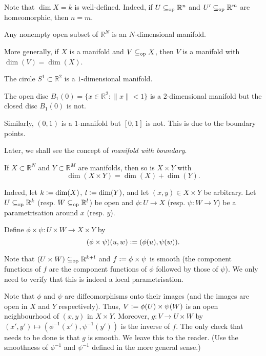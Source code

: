 Note that $\dim X = k$ is well-defined. Indeed, if $U \subseteq_{\operatorname{op}} \mathbb{R}^{n}$ and $U' \subseteq_{\operatorname{op}} \mathbb{R}^{m}$ are homeomorphic, then $n = m$.

\begin{ex}
	Any nonempty open subset of $\mathbb{R}^{N}$ is an $N$-dimensional manifold.

	More generally, if $X$ is a manifold and $V \subseteq_{\operatorname{op}} X$, then $V$ is a manifold with $\dim(V) = \dim(X)$.
\end{ex}

\begin{ex}
	The circle $S^{1} \subset \mathbb{R}^{2}$ is a $1$-dimensional manifold.

	The open disc $B_{1}(0) = \{x \in \mathbb{R}^{2} : \|x\| < 1\}$ is a $2$-dimensional manifold but the closed disc $\overline{B_{1}(0)}$ is not. 

	Similarly, $(0, 1)$ is a $1$-manifold but $[0, 1]$ is not. This is due to the boundary points.

	Later, we shall see the concept of \emph{manifold with boundary}.
\end{ex}

\begin{ex}
	If $X \subset \mathbb{R}^{N}$ and $Y \subset \mathbb{R}^{M}$ are manifolds, then so is $X \times Y$ with
	\begin{equation*} 
		\boxed{\dim(X \times Y) = \dim(X) + \dim(Y).}
	\end{equation*}

	Indeed, let $k \vcentcolon= \dim(X)$, $l \vcentcolon= \dim(Y)$, and let $(x, y) \in X \times Y$ be arbitrary. Let $U \subseteq_{\operatorname{op}} \mathbb{R}^{k}$ (resp. $W \subseteq_{\operatorname{op}} \mathbb{R}^{l}$) be open and $\phi : U \to X$ (resp. $\psi : W \to Y$) be a parametrisation around $x$ (resp. $y$). 

	Define $\phi \times \psi : U \times W \to X \times Y$ by
	\begin{equation*} 
		(\phi \times \psi)(u, w) \vcentcolon= (\phi(u), \psi(w)).
	\end{equation*}

	Note that $(U \times W) \subseteq_{\operatorname{op}} \mathbb{R}^{k + l}$ and $f \vcentcolon= \phi \times \psi$ is smooth (the component functions of $f$ are the component functions of $\phi$ followed by those of $\psi$). We only need to verify that this is indeed a local parametrisation.

	Note that $\phi$ and $\psi$ are diffeomorphisms onto their images (and the images are open in $X$ and $Y$ respectively). Thus, $V \vcentcolon= \phi(U) \times \psi(W)$ is an open neighbourhood of $(x, y)$ in $X \times Y$. Moreover, $g : V \to U \times W$ by $(x', y') \mapsto (\phi^{-1}(x'), \psi^{-1}(y'))$ is the inverse of $f$. \newline
	The only check that needs to be done is that $g$ is smooth. We leave this to the reader. (Use the smoothness of $\phi^{-1}$ and $\psi^{-1}$ defined in the more general sense.)
\end{ex}


